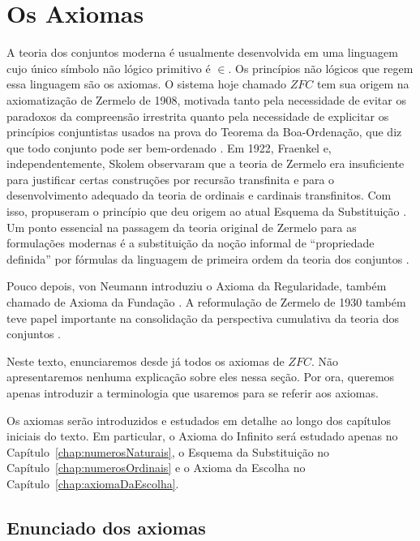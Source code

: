 \section{Os Axiomas}

A teoria dos conjuntos moderna é usualmente desenvolvida em uma linguagem cujo único símbolo não lógico primitivo é $\in$.
Os princípios não lógicos que regem essa linguagem são os axiomas.
O sistema hoje chamado $ZFC$ tem sua origem na axiomatização de Zermelo de 1908, motivada tanto pela necessidade de evitar os paradoxos da compreensão irrestrita quanto pela necessidade de explicitar os princípios conjuntistas usados na prova do Teorema da Boa-Ordenação, que diz que todo conjunto pode ser bem-ordenado \cite{zermelo1908untersuchungen,moore1978origins}.
Em 1922, Fraenkel e, independentemente, Skolem observaram que a teoria de Zermelo era insuficiente para justificar certas construções por recursão transfinita e para o desenvolvimento adequado da teoria de ordinais e cardinais transfinitos.
Com isso, propuseram o princípio que deu origem ao atual Esquema da Substituição \cite{fraenkel1922grundlagen,skolem1923bemerkungen}.
Um ponto essencial na passagem da teoria original de Zermelo para as formulações modernas é a substituição da noção informal de ``propriedade definida'' por fórmulas da linguagem de primeira ordem da teoria dos conjuntos \cite{skolem1923bemerkungen}.

Pouco depois, von Neumann introduziu o Axioma da Regularidade, também chamado de Axioma da Fundação \cite{vonneumann1925axiomatisierung}.
A reformulação de Zermelo de 1930 também teve papel importante na consolidação da perspectiva cumulativa da teoria dos conjuntos \cite{zermelo1930grenzzahlen,kanamori2004zermelo}.

Neste texto, enunciaremos desde já todos os axiomas de $ZFC$.
Não apresentaremos nenhuma explicação sobre eles nessa seção.
Por ora, queremos apenas introduzir a terminologia que usaremos para se referir aos axiomas.

Os axiomas serão introduzidos e estudados em detalhe ao longo dos capítulos iniciais do texto.
Em particular, o Axioma do Infinito será estudado apenas no Capítulo~\ref{chap:numerosNaturais}, o Esquema da Substituição no Capítulo~\ref{chap:numerosOrdinais} e o Axioma da Escolha no Capítulo~\ref{chap:axiomaDaEscolha}.

\subsection{Enunciado dos axiomas}

